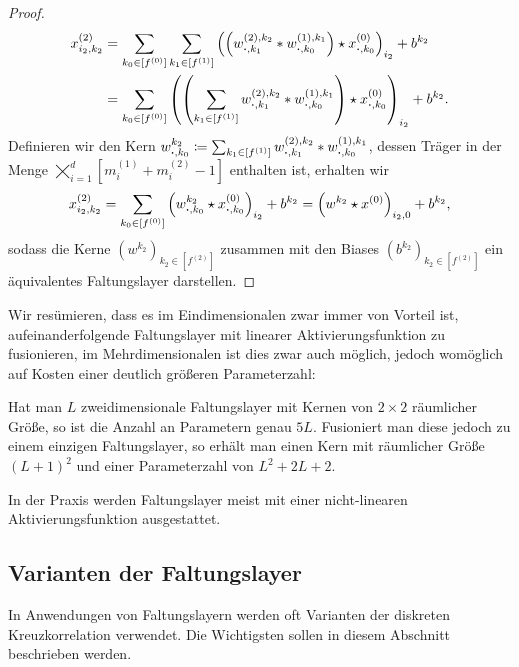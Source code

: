 \documentclass[paper=a4, 	%
		fontsize=11pt,
		abstract=true, 	%
		headsepline, 	%
		notitlepage	%
		]{scrartcl}
\theoremstyle{definition}
\newcommand{\fNat}[1]{[ #1 ]}
\begin{document}
\begin{proof}
    \begin{align*}
        x^{(2)}_{i_2,k_2} 
        &= \sum_{k_0\in \fNat{f^{(0)}}}\sum_{k_1\in \fNat{f^{(1)}}}  \left( \left( w^{(2),k_2}_{\bcdot,k_1} * 
        w^{(1),k_1}_{\bcdot,k_0}\right) \star x^{(0)}_{\bcdot,k_0}
        \right)_{i_2} + b^{k_2} \\
        &= \sum_{k_0\in \fNat{f^{(0)}}} \left( \left(
            \sum_{k_1\in \fNat{f^{(1)}}}  w^{(2),k_2}_{\bcdot,k_1} * 
        w^{(1),k_1}_{\bcdot,k_0}\right) \star x^{(0)}_{\bcdot,k_0}
        \right)_{i_2} + b^{k_2}.
    \end{align*}
    Definieren wir den Kern $w^{k_2}_{\bcdot, k_0} \coloneqq \sum_{k_1\in \fNat{f^{(1)}}}  w^{(2),k_2}_{\bcdot,k_1} * 
    w^{(1),k_1}_{\bcdot,k_0}$, dessen Träger in der Menge $\bigtimes_{i=1}^d \fNat{m^{(1)}_i + m^{(2)}_i - 1}$ enthalten ist, erhalten wir
    \[
        x^{(2)}_{i_2, k_2}
        = \sum_{k_0\in \fNat{f^{(0)}}} \left( w^{k_2}_{\bcdot, k_0}\star x^{(0)}_{\bcdot,k_0}
        \right)_{i_2} + b^{k_2}
        = \left( w^{k_2} \star x^{(0)} \right)_{i_2, 0} + b^{k_2},
    \]
    sodass die Kerne $(w^{k_2})_{k_2\in\fNat{f^{(2)}}}$ zusammen mit den Biases $(b^{k_2})_{k_2\in\fNat{f^{(2)}}}$ ein äquivalentes Faltungslayer darstellen.
\end{proof}

Wir resümieren, dass es im Eindimensionalen zwar immer von Vorteil ist, aufeinanderfolgende Faltungslayer mit linearer Aktivierungsfunktion zu fusionieren, im Mehrdimensionalen ist dies zwar auch möglich, jedoch womöglich auf Kosten einer deutlich größeren Parameterzahl:

Hat man $L$ zweidimensionale Faltungslayer mit Kernen von $2\times 2$ räumlicher Größe, so ist die Anzahl an Parametern genau $5L$.
Fusioniert man diese jedoch zu einem einzigen Faltungslayer, so erhält man einen Kern mit räumlicher Größe $(L+1)^2$ und einer Parameterzahl von $L^2 + 2L + 2$.

In der Praxis werden Faltungslayer meist mit einer nicht-linearen Aktivierungsfunktion ausgestattet.

\subsection{Varianten der Faltungslayer}\label{subsec:variants-of-cross-corr}

In Anwendungen von Faltungslayern werden oft Varianten der diskreten Kreuzkorrelation verwendet.
Die Wichtigsten sollen in diesem Abschnitt beschrieben werden.
\end{document}
